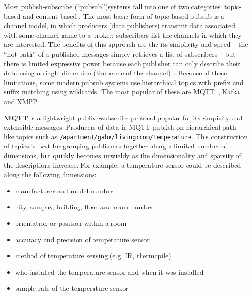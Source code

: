 Most publish-subscribe (``pubsub'')systems fall into one of two categories: topic-based and content based \cite{eugster2003many}.
The most basic form of topic-based pubsub is a channel model, in which producers (data publishers) transmit data associated with some channel name to a broker; subscribers list the channels in which they are interested.
The benefits of this approach are the its simplicity and speed -- the ``hot path'' of a published messages simply retrieves a list of subscribers -- but there is limited expressive power because each publisher can only describe their data using a single dimension (the name of the channel)~\cite{redis}.
Because of these limitations, some modern pubsub systems use hierarchical topics with prefix and suffix matching using wildcards. The most popular of these are MQTT~\cite{locke2010mq}, Kafka~\cite{kreps2011kafka} and XMPP~\cite{saint2011extensible}.


\textbf{MQTT} is a lightweight publish-subscribe protocol popular for its simpicity and extensible messages.
Producers of data in MQTT publish on hierarchical path-like topics such as \texttt{/apartment/gabe/livingroom/temperature}.
This construction of topics is best for grouping publishers together along a limited number of dimensions, but quickly becomes unwieldy as the dimensionality and sparsity of the descriptions increase.
For example, a temperature sensor could be described along the following dimensions:

\begin{itemize}
\item manufacturer and model number
\item city, campus, building, floor and  room number
\item orientation or position within a room
\item accuracy and precision of temperature sensor
\item method of temperature sensing (e.g. IR, thermopile)
\item who installed the temperature sensor and when it was installed
\item sample rate of the temperature sensor
\end{itemize}

